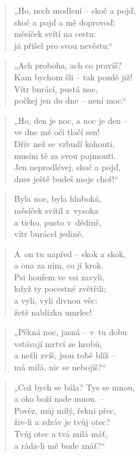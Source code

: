 \begin{verse}
„Ho, nech modlení -- skoč a pojď, \\
skoč a pojď a mě doprovoď; \\
měsíček svítí na cestu: \\
já přišel pro svou nevěstu.“
\end{verse}

\begin{verse}
„Ach proboha, ach co pravíš? \\
Kam bychom šli -- tak pozdě již! \\
Vítr burácí, pustá noc, \\
počkej jen do dne -- není moc.“
\end{verse}

\begin{verse}
„Ho, den je noc, a noc je den -- \\
ve dne mé oči tlačí sen! \\
Dřív než se vzbudí kohouti, \\
musím tě za svou pojmouti. \\
Jen neprodlévej, skoč a pojď, \\
dnes ještě budeš moje choť!“
\end{verse}

\begin{verse}
Byla noc, byla hluboká, \\
měsíček svítil z~vysoka \\
a ticho, pusto v~dědině, \\
vítr burácel jedině.
\end{verse}

\begin{verse}
A~on tu napřed -- skok a skok, \\
a ona za ním, co jí krok. \\
Psi houfem ve vsi zavyli, \\
když ty pocestné zvětřili; \\
a vyli, vyli divnou věc: \\
žetě nablízku umrlec!
\end{verse}

\begin{verse}
„Pěkná noc, jasná -- v~tu dobu \\
vstávají mrtví ze hrobů, \\
a nežli zvíš, jsou tobě blíž -- \\
má milá, nic se nebojíš?“
\end{verse}

\begin{verse}
„Což bych se bála? Tys se mnou, \\
a oko boží nade mnou. -- \\
Pověz, můj milý, řekni přec, \\
živ-li a zdráv je tvůj otec? \\
Tvůj otec a tvá milá máť, \\
a ráda-li mě bude znáť?“
\end{verse}

